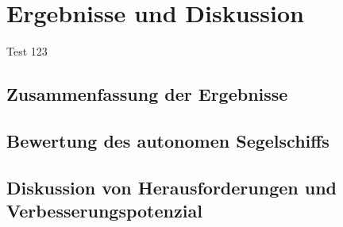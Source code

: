 

\chapter{Ergebnisse und Diskussion }
\label{chap:diskussion}
Test 123

\section{Zusammenfassung der Ergebnisse}
\section{Bewertung des autonomen Segelschiffs}
\section{Diskussion von Herausforderungen und Verbesserungspotenzial}

